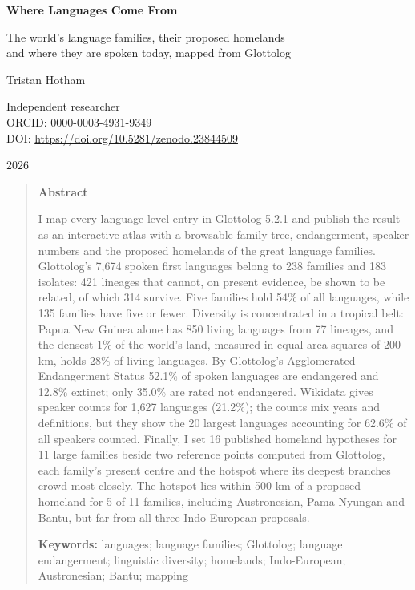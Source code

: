 \documentclass[11pt,a4paper]{article}
\begin{document}
\begin{center}
{\Large\bfseries Where Languages Come From\par}
\vspace{0.4em}
{\large The world's language families, their proposed homelands\\and where they are spoken today, mapped from Glottolog\par}
\vspace{1.2em}
{\large Tristan Hotham\par}
\vspace{0.3em}
{\small Independent researcher\\
ORCID: 0000-0003-4931-9349\\
DOI: \href{https://doi.org/10.5281/zenodo.23844509}{https://doi.org/10.5281/zenodo.23844509}\par}
\vspace{0.8em}
2026
\end{center}

\begin{quote}
\small
\begin{center}\textbf{Abstract}\end{center}
I map every language-level entry in Glottolog 5.2.1 and publish the result as an interactive atlas with a browsable family tree, endangerment, speaker numbers and the proposed homelands of the great language families. Glottolog's 7,674 spoken first languages belong to 238 families and 183 isolates: 421 lineages that cannot, on present evidence, be shown to be related, of which 314 survive. Five families hold 54\% of all languages, while 135 families have five or fewer. Diversity is concentrated in a tropical belt: Papua New Guinea alone has 850 living languages from 77 lineages, and the densest 1\% of the world's land, measured in equal-area squares of 200 km, holds 28\% of living languages. By Glottolog's Agglomerated Endangerment Status 52.1\% of spoken languages are endangered and 12.8\% extinct; only 35.0\% are rated not endangered. Wikidata gives speaker counts for 1,627 languages (21.2\%); the counts mix years and definitions, but they show the 20 largest languages accounting for 62.6\% of all speakers counted. Finally, I set 16 published homeland hypotheses for 11 large families beside two reference points computed from Glottolog, each family's present centre and the hotspot where its deepest branches crowd most closely. The hotspot lies within 500 km of a proposed homeland for 5 of 11 families, including Austronesian, Pama-Nyungan and Bantu, but far from all three Indo-European proposals.

\textbf{Keywords:} languages; language families; Glottolog; language endangerment; linguistic diversity; homelands; Indo-European; Austronesian; Bantu; mapping
\end{quote}
\end{document}
